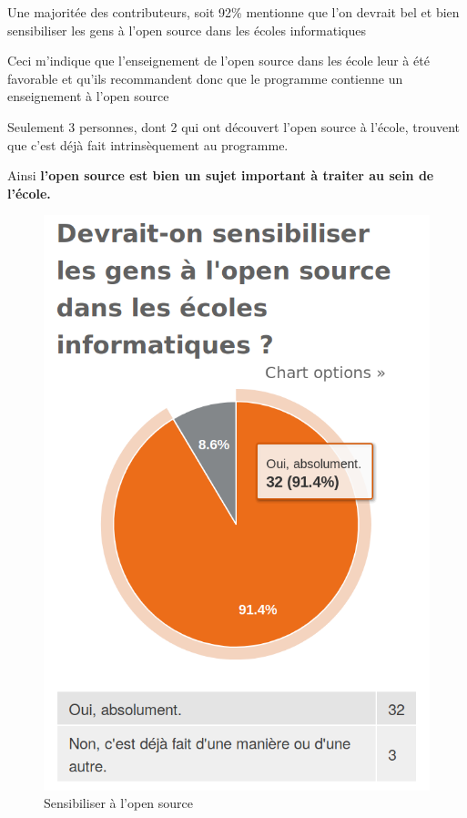 			Une majoritée des contributeurs, soit 92\% mentionne que l'on devrait bel et bien sensibiliser les gens à l'open source dans les écoles informatiques

			Ceci m'indique que l'enseignement de l'open source dans les école leur à été favorable et qu'ils recommandent donc que le programme contienne un enseignement à l'open source

			Seulement 3 personnes, dont 2 qui ont découvert l'open source à l'école, trouvent que c'est déjà fait intrinsèquement au programme.

			Ainsi \textbf{l'open source est bien un sujet important à traiter au sein de l'école.}

			\begin{figure}[ht]
				\center
				\includegraphics[scale=0.28]{./img/a6}
				\caption{Sensibiliser à l'open source}
			\end{figure}

